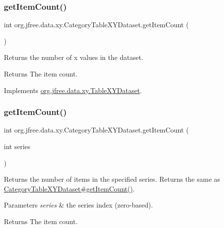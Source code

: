 \subsubsection{\texorpdfstring{get\+Item\+Count()}{getItemCount()}\hspace{0.1cm}{\footnotesize\ttfamily [1/2]}}
{\footnotesize\ttfamily int org.\+jfree.\+data.\+xy.\+Category\+Table\+X\+Y\+Dataset.\+get\+Item\+Count (\begin{DoxyParamCaption}{ }\end{DoxyParamCaption})}

Returns the number of x values in the dataset.

\begin{DoxyReturn}{Returns}
The item count. 
\end{DoxyReturn}


Implements \mbox{\hyperlink{interfaceorg_1_1jfree_1_1data_1_1xy_1_1_table_x_y_dataset_ad9cd378be982c1d61cfb93a16370b6f0}{org.\+jfree.\+data.\+xy.\+Table\+X\+Y\+Dataset}}.

\mbox{\label{classorg_1_1jfree_1_1data_1_1xy_1_1_category_table_x_y_dataset_a4e9554da109c26a84321724a1a06bd27}} 
\subsubsection{\texorpdfstring{get\+Item\+Count()}{getItemCount()}\hspace{0.1cm}{\footnotesize\ttfamily [2/2]}}
{\footnotesize\ttfamily int org.\+jfree.\+data.\+xy.\+Category\+Table\+X\+Y\+Dataset.\+get\+Item\+Count (\begin{DoxyParamCaption}\item[{int}]{series }\end{DoxyParamCaption})}

Returns the number of items in the specified series. Returns the same as \mbox{\hyperlink{classorg_1_1jfree_1_1data_1_1xy_1_1_category_table_x_y_dataset_ae1129096e67aae2724cfe36586062443}{Category\+Table\+X\+Y\+Dataset\#get\+Item\+Count()}}.


\begin{DoxyParams}{Parameters}
{\em series} & the series index (zero-\/based).\\
\hline
\end{DoxyParams}
\begin{DoxyReturn}{Returns}
The item count. 
\end{DoxyReturn}


